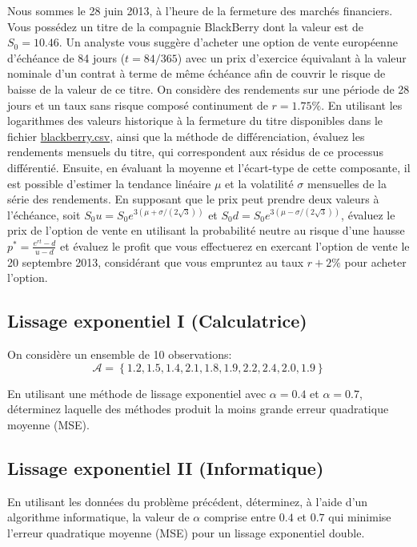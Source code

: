 \documentclass[11pt,english,francais]{article}
\begin{document}
Nous sommes le 28 juin 2013, à l'heure de la fermeture des marchés
financiers. Vous possédez un titre de la compagnie BlackBerry dont la
valeur est de $S_0 = 10.46$. Un analyste vous suggère d'acheter une
option de vente européenne d'échéance de 84 jours ($t=84/365$) avec un
prix d'exercice équivalant à la valeur nominale d'un contrat à terme
de même échéance afin de couvrir le risque de baisse de la valeur de
ce titre. On considère des rendements sur une période de 28 jours et
un taux sans risque composé continument de $r=1.75\%$.  En utilisant
les logarithmes des valeurs historique à la fermeture du titre
disponibles dans le fichier \url{blackberry.csv}, ainsi que la méthode
de différenciation, évaluez les rendements mensuels du titre, qui
correspondent aux résidus de ce processus différentié. Ensuite, en
évaluant la moyenne et l'écart-type de cette composante, il est
possible d'estimer la tendance linéaire $\mu$ et la volatilité
$\sigma$ mensuelles de la série des rendements. En supposant que le
prix peut prendre deux valeurs à l'échéance, soit $S_0u = S_0
e^{3(\mu+\sigma/(2\sqrt{3}))}$ et $S_0d = S_0
e^{3(\mu-\sigma/(2\sqrt{3}))}$, évaluez le prix de l'option de vente
en utilisant la probabilité neutre au risque d'une hausse $p^{*} =
\frac{e^{rt}-d}{u-d}$ et évaluez le profit que vous effectuerez en
exercant l'option de vente le 20 septembre 2013, considérant que vous
empruntez au taux $r+2\%$ pour acheter l'option.

\subsection{Lissage exponentiel I (Calculatrice)}

On considère un ensemble de 10 observations:
\[
\mathcal{A}=\left\{1.2,1.5,1.4,2.1,1.8,1.9,2.2,2.4,2.0,1.9 \right\}
\]

En utilisant une méthode de lissage exponentiel avec $\alpha=0.4$ et
$\alpha=0.7$, déterminez laquelle des méthodes produit la moins grande
erreur quadratique moyenne (MSE).

\subsection{Lissage exponentiel II (Informatique)}

En utilisant les données du problème précédent, déterminez, à l'aide
d'un algorithme informatique, la valeur de $\alpha$ comprise entre $0.4$ et $0.7$ qui minimise l'erreur quadratique moyenne (MSE) pour un lissage exponentiel double.
\end{document}
